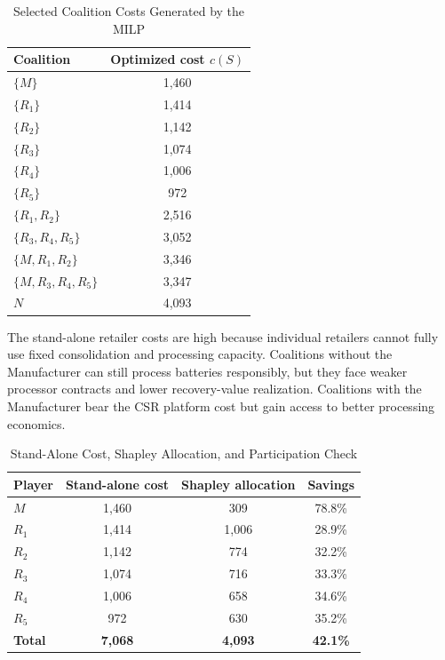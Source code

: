 \begin{table}[htbp]
\centering
\caption{Selected Coalition Costs Generated by the MILP}
\label{tab:coalition_costs}
\begin{tabular}{lc}
\toprule
\textbf{Coalition} & \textbf{Optimized cost $c(S)$} \\
\midrule
$\{M\}$ & 1,460 \\
$\{R_1\}$ & 1,414 \\
$\{R_2\}$ & 1,142 \\
$\{R_3\}$ & 1,074 \\
$\{R_4\}$ & 1,006 \\
$\{R_5\}$ & 972 \\
$\{R_1,R_2\}$ & 2,516 \\
$\{R_3,R_4,R_5\}$ & 3,052 \\
$\{M,R_1,R_2\}$ & 3,346 \\
$\{M,R_3,R_4,R_5\}$ & 3,347 \\
$N$ & 4,093 \\
\bottomrule
\end{tabular}
\end{table}

The stand-alone retailer costs are high because individual retailers cannot fully use fixed consolidation and processing capacity. Coalitions without the Manufacturer can still process batteries responsibly, but they face weaker processor contracts and lower recovery-value realization. Coalitions with the Manufacturer bear the CSR platform cost but gain access to better processing economics.

\begin{table}[htbp]
\centering
\caption{Stand-Alone Cost, Shapley Allocation, and Participation Check}
\label{tab:cost_comparison}
\begin{tabular}{lccc}
\toprule
\textbf{Player} & \textbf{Stand-alone cost} & \textbf{Shapley allocation} & \textbf{Savings} \\
\midrule
$M$ & 1,460 & 309 & 78.8\% \\
$R_1$ & 1,414 & 1,006 & 28.9\% \\
$R_2$ & 1,142 & 774 & 32.2\% \\
$R_3$ & 1,074 & 716 & 33.3\% \\
$R_4$ & 1,006 & 658 & 34.6\% \\
$R_5$ & 972 & 630 & 35.2\% \\
\midrule
\textbf{Total} & \textbf{7,068} & \textbf{4,093} & \textbf{42.1\%} \\
\bottomrule
\end{tabular}
\end{table}

